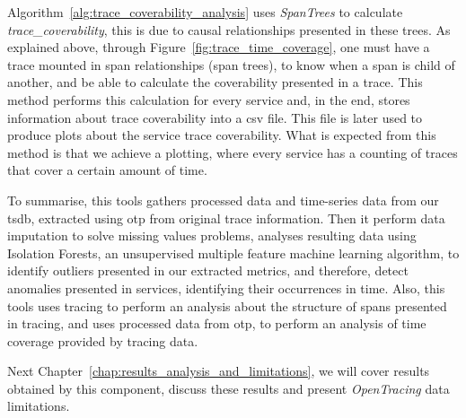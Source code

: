 Algorithm~\ref{alg:trace_coverability_analysis} uses \emph{SpanTrees} to calculate \emph{trace\_coverability}, this is due to causal relationships presented in these trees. As explained above, through Figure~\ref{fig:trace_time_coverage}, one must have a trace mounted in span relationships (span trees), to know when a span is child of another, and be able to calculate the coverability presented in a trace. This method performs this calculation for every service and, in the end, stores information about trace coverability into a \gls{csv} file. This file is later used to produce plots about the service trace coverability. What is expected from this method is that we achieve a plotting, where every service has a counting of traces that cover a certain amount of time.


To summarise, this tools gathers processed data and time-series data from our \gls{tsdb}, extracted using \gls{otp} from original trace information. Then it perform data imputation to solve missing values problems, analyses resulting data using Isolation Forests, an unsupervised multiple feature machine learning algorithm, to identify outliers presented in our extracted metrics, and therefore, detect anomalies presented in services, identifying their occurrences in time. Also, this tools uses tracing to perform an analysis about the structure of spans presented in tracing, and uses processed data from \gls{otp}, to perform an analysis of time coverage provided by tracing data.

Next Chapter~\ref{chap:results_analysis_and_limitations}, we will cover results obtained by this component, discuss these results and present \emph{OpenTracing} data limitations.

\checkoddpage
{}
{ %
    \newpage
    \blankpage}
{ %
}